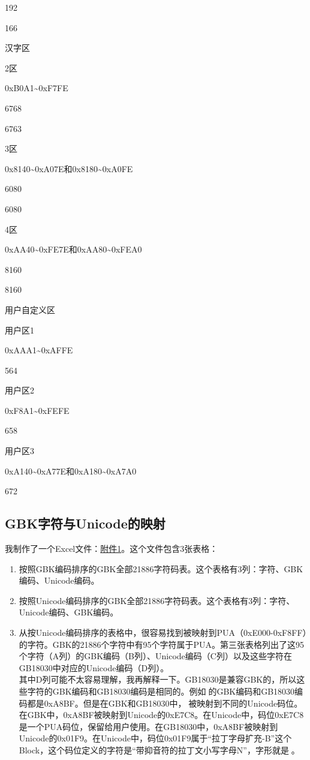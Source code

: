 \documentclass[cn,hazy,blue,14pt,screen]{elegantnote}
\begin{document}
192

166

汉字区

2区

0xB0A1\textasciitilde0xF7FE

6768

6763

3区

0x8140\textasciitilde0xA07E和0x8180\textasciitilde0xA0FE

6080

6080

4区

0xAA40\textasciitilde0xFE7E和0xAA80\textasciitilde0xFEA0

8160

8160

用户自定义区

用户区1

0xAAA1\textasciitilde0xAFFE

564

用户区2

0xF8A1\textasciitilde0xFEFE

658

用户区3

0xA140\textasciitilde0xA77E和0xA180\textasciitilde0xA7A0

672

\hypertarget{gbkux5b57ux7b26ux4e0eunicodeux7684ux6620ux5c04}{%
\subsection{GBK字符与Unicode的映射}\label{gbkux5b57ux7b26ux4e0eunicodeux7684ux6620ux5c04}}

我制作了一个Excel文件：\href{samples/gbk.zip}{附件1}。这个文件包含3张表格：

\begin{enumerate}

\item
  按照GBK编码排序的GBK全部21886字符码表。这个表格有3列：字符、GBK编码、Unicode编码。
\item
  按照Unicode编码排序的GBK全部21886字符码表。这个表格有3列：字符、Unicode编码、GBK编码。
\item
  从按Unicode编码排序的表格中，很容易找到被映射到PUA（0xE000-0xF8FF）的字符。GBK的21886个字符中有95个字符属于PUA。第三张表格列出了这95个字符（A列）的GBK编码（B列）、Unicode编码（C列）以及这些字符在GB18030中对应的Unicode编码（D列）。\\
  其中D列可能不太容易理解，我再解释一下。GB18030是兼容GBK的，所以这些字符的GBK编码和GB18030编码是相同的。例如的GBK编码和GB18030编码都是0xA8BF。但是在GBK和GB18030中，被映射到不同的Unicode码位。在GBK中，0xA8BF被映射到Unicode的0xE7C8。在Unicode中，码位0xE7C8是一个PUA码位，保留给用户使用。在GB18030中，0xA8BF被映射到Unicode的0x01F9。在Unicode中，码位0x01F9属于``拉丁字母扩充-B''这个Block，这个码位定义的字符是``带抑音符的拉丁文小写字母N''，字形就是。
\end{enumerate}
\end{document}
